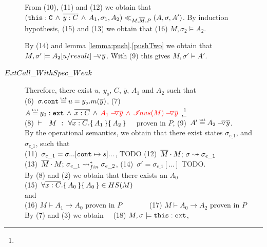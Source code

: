 \begin{description}
 From (10), (11) and (12) we obtain that $( \prg{this}:\prg{C}\, \wedge\, \overline{y:C}\, \wedge\, A_1,\sigma_1,A_2) \ll_{M,\Mtwo,P} (A,\sigma,A')$. By induction hypothesis, (15) and (13) we obtain that (16) $M,\sigma_2 \models A_2$.
 
 By (14) and lemma  \ref{lemma:push}.\ref{pushTwo}  we obtain that 
\ \ $M,\sigma' \models \PushAS  {y} {A_2[ u/result]}$. \. With (9) this gives $M,\sigma' \models A'$.

\item[${\sc{ExtCall\_WithSpec\_Weak}}$]

Therefore, there exist $u$, $y_o$, $C$, $\overline y$,  $A_1$ and $A_2$ such that \\
(6)\ $\sigma.\prg{cont}\txteq u=y_o.m(\overline y)$,  \hspace{2cm}
 (7)\ $A \txteq   { \external{y_0} }\, \wedge \, \overline {x:C}  \, \wedge \,  \red{\PushAS  {y}{  A_1} \,   \wedge \,  \PushAS {y}{\extract{M}}}\ $,\footnote{}
\\
 (8)\ $\promises M   {\TwoStatesQ {\overline {x:C}} {A_1}{A_2}}$ \ \ proven in $P$,   \hspace{1cm}
 (9)\ $A' \txteq \PushAS  {y} { A_2}$. 
 \\
 By the operational semantics, we obtain that there exist states $\sigma_{e\_1}$, and $\sigma_{e\_1}$, such that \\
 (11)\ $\sigma_{e\_1}=\sigma ...[\prg{cont}\mapsto s]... $, TODO   \hspace{1cm}
   (12)\ $\leadstoBounded  {\Mtwo\cdot M}  {\sigma}  {\sigma_{e\_1}}$ \\
 (13)\ $\leadstoBoundedStarFin {\Mtwo\cdot M}  {\sigma_{e\_1}}  {\sigma_{e\_2}}$,   \hspace{1cm}
 (14)\ $\sigma'=\sigma_{e\_1}[...]$ TODO.
\\
By (8) and (2) we obtain that there exists an $A_0$ \\
(15)\ $\TwoStatesQ {\overline {x:C}} {A_0}{A_0} \in HS(M)$\\ and \\
 (16) $M \vdash A_1 \rightarrow A_0$ proven in $P$ \ \ \ \ \ \ \  (17) $M \vdash A_0 \rightarrow A_2$ proven in $P$ \\
By (7) and (3) we obtain \ \ 
(18) $M, \sigma \models \external{\prg{this}}$, %

\end{description}
